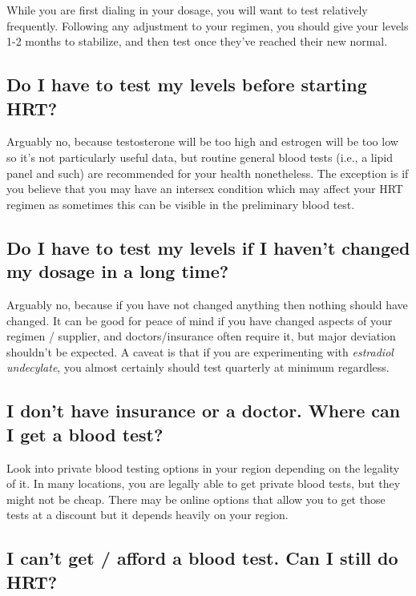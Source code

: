 \documentclass{article}
\begin{document}
While you are first dialing in your dosage, you will want to test relatively frequently. Following any adjustment to your regimen, you should give your levels 1-2 months to stabilize, and then test once they've reached their new normal.

\subsection{Do I have to test my levels before starting HRT?}

Arguably no, because testosterone will be too high and estrogen will be too low so it’s not particularly useful data, but routine general blood tests (i.e., a lipid panel and such) are recommended for your health nonetheless. The exception is if you believe that you may have an intersex condition which may affect your HRT regimen as sometimes this can be visible in the preliminary blood test.

\subsection{Do I have to test my levels if I haven’t changed my dosage in a long time?}

Arguably no, because if you have not changed anything then nothing should have changed. It can be good for peace of mind if you have changed aspects of your regimen / supplier, and doctors/insurance often require it, but major deviation shouldn’t be expected. A caveat is that if you are experimenting with \textit{estradiol undecylate}, you almost certainly should test quarterly at minimum regardless.

\subsection{I don’t have insurance or a doctor. Where can I get a blood test?}

Look into private blood testing options in your region depending on the legality of it. In many locations, you are legally able to get private blood tests, but they might not be cheap. There may be online options that allow you to get those tests at a discount but it depends heavily on your region.

\subsection{I can’t get / afford a blood test. Can I still do HRT?}
\end{document}
